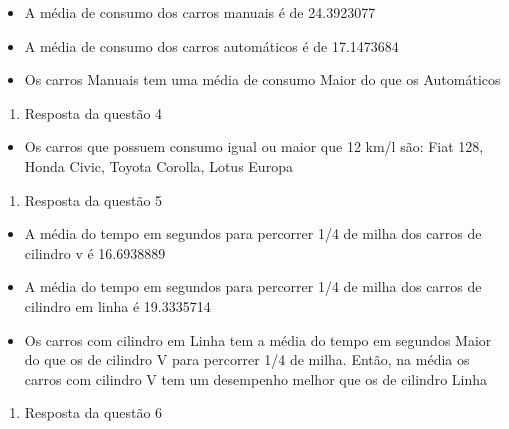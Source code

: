 \documentclass[
]{article}
\newenvironment{Shaded}{\begin{snugshade}}{\end{snugshade}}
\newcommand{\FunctionTok}[1]{\textcolor[rgb]{0.00,0.00,0.00}{#1}}
\newcommand{\NormalTok}[1]{#1}
\newcommand{\SpecialCharTok}[1]{\textcolor[rgb]{0.00,0.00,0.00}{#1}}
\providecommand{\tightlist}{%
  \setlength{\itemsep}{0pt}\setlength{\parskip}{0pt}}
\begin{document}
\begin{itemize}
\tightlist
\item
  A média de consumo dos carros manuais é de 24.3923077
\item
  A média de consumo dos carros automáticos é de 17.1473684
\item
  Os carros Manuais tem uma média de consumo Maior do que os Automáticos
\end{itemize}

\begin{enumerate}
\def\labelenumi{\arabic{enumi}.}
\setcounter{enumi}{3}
\tightlist
\item
  Resposta da questão 4
\end{enumerate}

\begin{itemize}
\tightlist
\item
  Os carros que possuem consumo igual ou maior que 12 km/l são: Fiat
  128, Honda Civic, Toyota Corolla, Lotus Europa
\end{itemize}

\begin{enumerate}
\def\labelenumi{\arabic{enumi}.}
\setcounter{enumi}{4}
\tightlist
\item
  Resposta da questão 5
\end{enumerate}

\begin{itemize}
\tightlist
\item
  A média do tempo em segundos para percorrer 1/4 de milha dos carros de
  cilindro v é 16.6938889
\item
  A média do tempo em segundos para percorrer 1/4 de milha dos carros de
  cilindro em linha é 19.3335714
\item
  Os carros com cilindro em Linha tem a média do tempo em segundos Maior
  do que os de cilindro V para percorrer 1/4 de milha. Então, na média
  os carros com cilindro V tem um desempenho melhor que os de cilindro
  Linha
\end{itemize}

\begin{enumerate}
\def\labelenumi{\arabic{enumi}.}
\setcounter{enumi}{5}
\tightlist
\item
  Resposta da questão 6
\end{enumerate}

\begin{Shaded}
\end{Shaded}
\end{document}
